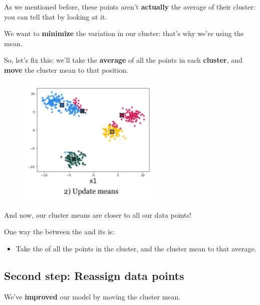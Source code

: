         As we mentioned before, these points aren't \textbf{actually} the average of their cluster: you can tell that by looking at it.
        
        We want to \textbf{minimize} the variation in our cluster: that's why we're using the mean.
        
        So, let's fix this: we'll take the \textbf{average} of all the points in each \textbf{cluster}, and \textbf{move} the cluster mean to that position.
        
        \begin{figure}[H]
            \centering
            \includegraphics[width=70mm,scale=0.4]{images/clustering_images/update_means_clustering.png}
        \end{figure}
        
        And now, our cluster means are closer to all our data points!\\
        
        \begin{concept}
            One way  the  between the  and its  is:
            
            \begin{itemize}
                \item Take the  of all the points in the cluster, and  the cluster mean to that average.
            \end{itemize} 
        \end{concept}
        
    \subsection{Second step: Reassign data points}
    
        We've \textbf{improved} our model by moving the cluster mean.
        
